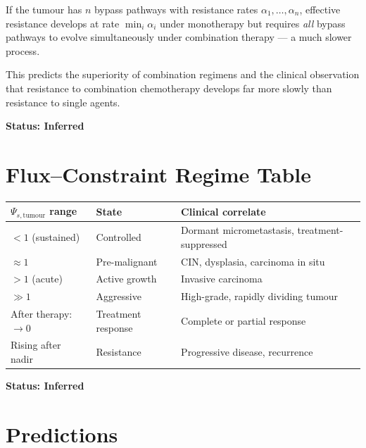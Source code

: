 \documentclass[12pt,a4paper]{article}
\begin{document}
If the tumour has $n$ bypass pathways with resistance rates $\alpha_1, \ldots, \alpha_n$, effective resistance develops at rate $\min_i \alpha_i$ under monotherapy but requires \textit{all} bypass pathways to evolve simultaneously under combination therapy --- a much slower process.

This predicts the superiority of combination regimens and the clinical observation that resistance to combination chemotherapy develops far more slowly than resistance to single agents.

\textbf{Status: Inferred}

\section{Flux--Constraint Regime Table}

\begin{center}
\begin{tabular}{lll}
\toprule
$\Psi_{s,\mathrm{tumour}}$ range & State & Clinical correlate \\
\midrule
$< 1$ (sustained) & Controlled & Dormant micrometastasis, treatment-suppressed \\
$\approx 1$ & Pre-malignant & CIN, dysplasia, carcinoma in situ \\
$> 1$ (acute) & Active growth & Invasive carcinoma \\
$\gg 1$ & Aggressive & High-grade, rapidly dividing tumour \\
After therapy: $\to 0$ & Treatment response & Complete or partial response \\
Rising after nadir & Resistance & Progressive disease, recurrence \\
\bottomrule
\end{tabular}
\end{center}

\textbf{Status: Inferred}

\section{Predictions}
\end{document}
